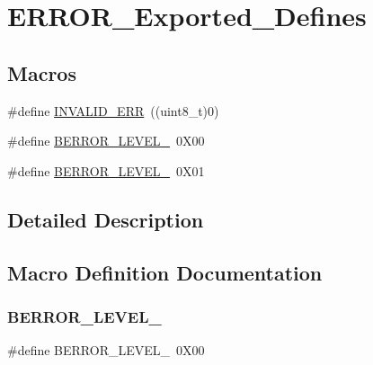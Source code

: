 \hypertarget{group___e_r_r_o_r___exported___defines}{}\section{E\+R\+R\+O\+R\+\_\+\+Exported\+\_\+\+Defines}
\label{group___e_r_r_o_r___exported___defines}
\subsection*{Macros}
\begin{DoxyCompactItemize}
\item 
\#define \mbox{\hyperlink{group___e_r_r_o_r___exported___defines_ga8d49c7318410d3a95e377134e1111737}{I\+N\+V\+A\+L\+I\+D\+\_\+\+E\+RR}}~((uint8\+\_\+t)0)
\item 
\#define \mbox{\hyperlink{group___e_r_r_o_r___exported___defines_ga46b2946579baf1320639e033bca23205}{B\+E\+R\+R\+O\+R\+\_\+\+L\+E\+V\+E\+L\+\_}}~0\+X00
\item 
\#define \mbox{\hyperlink{group___e_r_r_o_r___exported___defines_ga4a2ebb84ec4be3f3eccea4fba43f9e79}{B\+E\+R\+R\+O\+R\+\_\+\+L\+E\+V\+E\+L\+\_}}~0\+X01
\end{DoxyCompactItemize}


\subsection{Detailed Description}


\subsection{Macro Definition Documentation}
\mbox{\label{group___e_r_r_o_r___exported___defines_ga46b2946579baf1320639e033bca23205}} 
\subsubsection{\texorpdfstring{B\+E\+R\+R\+O\+R\+\_\+\+L\+E\+V\+E\+L\+\_}{BERROR\_LEVEL\_0}}
{\footnotesize\ttfamily \#define B\+E\+R\+R\+O\+R\+\_\+\+L\+E\+V\+E\+L\+\_~0\+X00}



